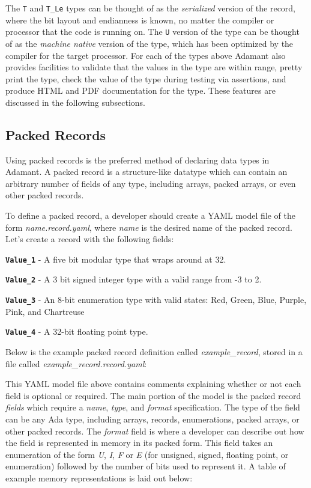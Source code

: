 The \texttt{T} and \texttt{T\_Le} types can be thought of as the \textit{serialized} version of the record, where the bit layout and endianness is known, no matter the compiler or processor that the code is running on. The \texttt{U} version of the type can be thought of as the \textit{machine native} version of the type, which has been optimized by the compiler for the target processor. For each of the types above Adamant also provides facilities to validate that the values in the type are within range, pretty print the type, check the value of the type during testing via assertions, and produce HTML and PDF documentation for the type. These features are discussed in the following subsections.

\subsection{Packed Records} \label{Packed Records}

Using packed records is the preferred method of declaring data types in Adamant. A packed record is a structure-like datatype which can contain an arbitrary number of fields of any type, including arrays, packed arrays, or even other packed records.

To define a packed record, a developer should create a YAML model file of the form \textit{name.record.yaml}, where \textit{name} is the desired name of the packed record. Let's create a record with the following fields:

\begin{spaceditemize}
  \item \textbf{\texttt{Value\_1}} - A five bit modular type that wraps around at 32.
  \item \textbf{\texttt{Value\_2}} - A 3 bit signed integer type with a valid range from -3 to 2.
  \item \textbf{\texttt{Value\_3}} - An 8-bit enumeration type with valid states: Red, Green, Blue, Purple, Pink, and Chartreuse
  \item \textbf{\texttt{Value\_4}} - A 32-bit floating point type.
\end{spaceditemize}

Below is the example packed record definition called \textit{example\_record}, stored in a file called \textit{example\_record.record.yaml}:


This YAML model file above contains comments explaining whether or not each field is optional or required. The main portion of the model is the packed record \textit{fields} which require a \textit{name}, \textit{type}, and \textit{format} specification. The type of the field can be any Ada type, including arrays, records, enumerations, packed arrays, or other packed records. The \textit{format} field is where a developer can describe out how the field is represented in memory in its packed form. This field takes an enumeration of the form \textit{U}, \textit{I}, \textit{F} or \textit{E} (for unsigned, signed, floating point, or enumeration) followed by the number of bits used to represent it. A table of example memory representations is laid out below:

